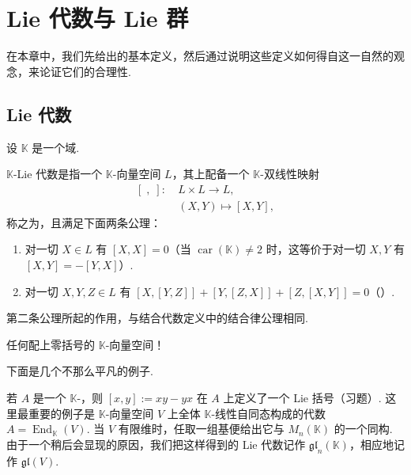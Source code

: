 \chapter{Lie 代数与 Lie 群}\label{chap:ssl-1}

在本章中，我们先给出的基本定义，然后通过说明这些定义如何得自这一自然的观念，来论证它们的合理性.

\section{Lie 代数}\label{sec:ssl-1-1}

设 $\mathbb{K}$ 是一个域.

\begin{definition}\label{def:ssl-1-1-1}
$\mathbb{K}$-Lie 代数是指一个 $\mathbb{K}$-向量空间 $L$，其上配备一个 $\mathbb{K}$-双线性映射
\[
\begin{aligned}
[\;,\;]\colon\ & L\times L\to L,\\
& (X,Y)\mapsto [X,Y],
\end{aligned}
\]
称之为，且满足下面两条公理：
\begin{enumerate}[label=\roman*)]
\item 对一切 $X\in L$ 有 $[X,X]=0$（当 $\operatorname{car}(\mathbb{K})\neq 2$ 时，这等价于对一切 $X,Y$ 有 \mbox{$[X,Y]=-[Y,X]$）.}
\item 对一切 $X,Y,Z\in L$ 有 $[X,[Y,Z]]+[Y,[Z,X]]+[Z,[X,Y]]=0$（）.
\end{enumerate}
\end{definition}

\begin{remark*}
第二条公理所起的作用，与结合代数定义中的结合律公理相同.
\end{remark*}

\begin{example*}
任何配上零括号的 $\mathbb{K}$-向量空间！
\end{example*}

下面是几个不那么平凡的例子.

\begin{numpara}\label{np:ssl-1-1-2}
若 $A$ 是一个 $\mathbb{K}$-，则 $[x,y]:=xy-yx$ 在 $A$ 上定义了一个 Lie 括号（习题）. 这里最重要的例子是 $\mathbb{K}$-向量空间 $V$ 上全体 $\mathbb{K}$-线性自同态构成的代数 $A=\operatorname{End}_{\mathbb{K}}(V)$. 当 $V$ 有限维时，任取一组基便给出它与 $M_n(\mathbb{K})$ 的一个同构. 由于一个稍后会显现的原因，我们把这样得到的 Lie 代数记作 $\mathfrak{gl}_n(\mathbb{K})$，相应地记作 $\mathfrak{gl}(V)$.
\end{numpara}

